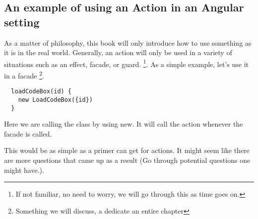 \subsection{An example of using an Action in an Angular setting}
As a matter of philosophy, this book will only introduce how to use something
as it is in the real world. Generally, an action will only be used in a variety
of situations such as an effect, facade, or guard. \footnote{If not familiar, no
need to worry, we will go through this as time goes on.}. As a simple example,
let's use it in a facade \footnote{Something we will discuss, a dedicate an
entire chapter}.

\begin{lstlisting}
  loadCodeBox(id) {
    new LoadCodeBox({id})
  }
\end{lstlisting}

Here we are calling the class by using new. It will call the action whenever the
facade is called.

This would be as simple as a primer can get for actions. It might seem like
there are more questions that came up as a result (Go through potential
questions one might have.).
